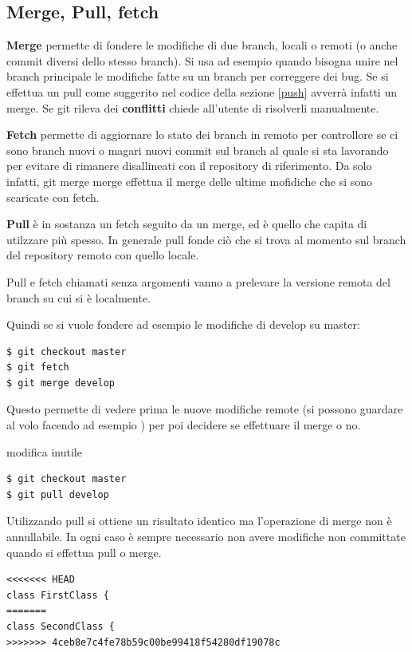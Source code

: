 \documentclass{article}
\begin{document}
\subsection{Merge, Pull, fetch}
\textbf{Merge} permette di fondere le modifiche di due branch, locali o remoti (o anche
commit diversi dello stesso branch). Si usa ad esempio quando bisogna unire nel branch principale
le modifiche fatte su un branch per correggere dei bug. Se si effettua un pull come suggerito
nel codice della sezione \ref{push} avverrà infatti un merge.
Se git rileva dei \textbf{conflitti} chiede all'utente di risolverli manualmente.

\textbf{Fetch} permette di aggiornare lo stato dei branch in remoto per controllore
se ci sono branch nuovi o magari nuovi commit sul branch al quale si sta lavorando per evitare
di rimanere disallineati con il repository di riferimento. Da solo infatti,
git merge merge effettua il merge delle ultime mofidiche che si sono scaricate
con fetch.

\textbf{Pull} è in sostanza un fetch seguito da un merge, ed è quello che capita di
utilzzare più spesso. In generale pull fonde ciò che si trova al momento sul
branch del repository remoto con quello locale.

Pull e fetch chiamati senza argomenti vanno a prelevare la versione remota del
branch su cui si è localmente.

Quindi se si vuole fondere ad esempio le modifiche di develop su master:

\begin{verbatim}
$ git checkout master
$ git fetch
$ git merge develop
\end{verbatim}

Questo permette di vedere prima le nuove modifiche remote (si possono guardare
al volo facendo ad esempio ) per poi decidere
se effettuare il merge o no.

modifica inutile

\begin{verbatim}
$ git checkout master
$ git pull develop
\end{verbatim}

Utilizzando pull si ottiene un risultato identico ma l'operazione di merge non è
annullabile.
In ogni caso è sempre necessario non avere modifiche non committate quando si
effettua pull o merge.

\begin{verbatim}
<<<<<<< HEAD
class FirstClass {
=======
class SecondClass {
>>>>>>> 4ceb8e7c4fe78b59c00be99418f54280df19078c
\end{verbatim}
\end{document}
